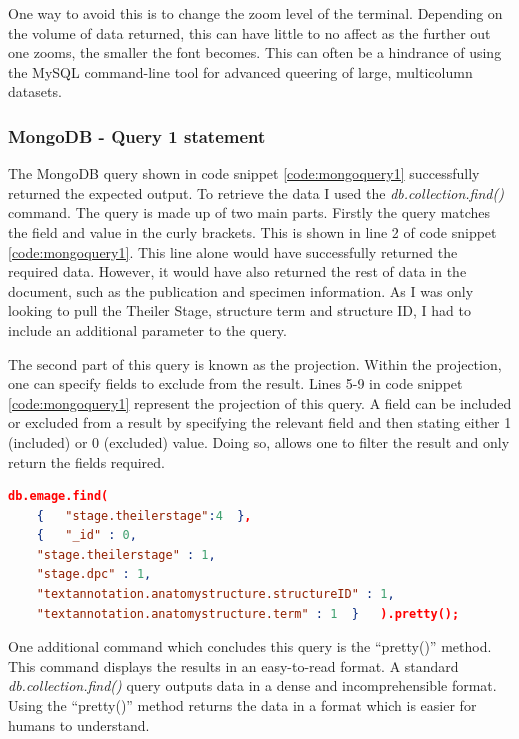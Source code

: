 One way to avoid this is to change the zoom level of the terminal. Depending on the volume of data returned, this can have little to no affect as the further out one zooms, the smaller the font becomes. This can often be a hindrance of using the MySQL command-line tool for advanced queering of large, multicolumn datasets.

\subsubsection*{MongoDB - Query 1 statement}\label{mongoquery1statement}
The MongoDB query shown in code snippet \ref{code:mongoquery1} successfully returned the expected output. To retrieve the data I used the \textit{db.collection.find()} command. The query is made up of two main parts. Firstly the query matches the field and value in the curly brackets. This is shown in line 2 of code snippet \ref{code:mongoquery1}. This line alone would have successfully returned the required data. However, it would have also returned the rest of data in the document, such as the publication and specimen information. As I was only looking to pull the Theiler Stage, structure term and structure ID, I had to include an additional parameter to the query.

The second part of this query is known as the projection. Within the projection, one can specify fields to exclude from the result. Lines 5-9 in code snippet \ref{code:mongoquery1} represent the projection of this query. A field can be included or excluded from a result by specifying the relevant field and then stating either 1 (included) or 0 (excluded) value. Doing so, allows one to filter the result and only return the fields required.

\begin{lstlisting}[language=json, caption=MongoDB Query 1 statement. All structures at Theiler Stage 4., label=code:mongoquery1]
db.emage.find(
	{	"stage.theilerstage":4	},
    {	"_id" : 0,
    "stage.theilerstage" : 1,
    "stage.dpc" : 1,
    "textannotation.anatomystructure.structureID" : 1,
    "textannotation.anatomystructure.term" : 1	}	).pretty();
\end{lstlisting}

One additional command which concludes this query is the ``pretty()'' method. This command displays the results in an easy-to-read format. A standard \textit{db.collection.find()} query outputs data in a dense and incomprehensible format. Using the ``pretty()'' method returns the data in a format which is easier for humans to understand.


